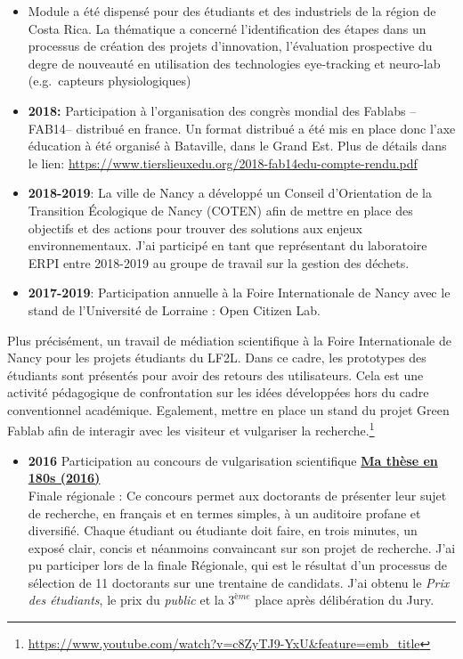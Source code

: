 \documentclass[
  12pt,
  oneside]{book}
\providecommand{\tightlist}{%
  \setlength{\itemsep}{0pt}\setlength{\parskip}{0pt}}
\begin{document}
\begin{itemize}
\item
  Module a été dispensé pour des étudiants et des industriels de la région de Costa Rica.
  La thématique a concerné l'identification des étapes dans un processus de création des projets d'innovation, l'évaluation prospective du degre de nouveauté en utilisation des technologies eye-tracking et neuro-lab (e.g.~capteurs physiologiques)
\item
  \textbf{2018:} Participation à l'organisation des congrès mondial des Fablabs --FAB14-- distribué en france. Un format distribué a été mis en place donc l'axe éducation à été organisé à Bataville, dans le Grand Est.
  Plus de détails dans le lien: \url{https://www.tierslieuxedu.org/2018-fab14edu-compte-rendu.pdf}
\item
  \textbf{2018-2019}: La ville de Nancy a développé un Conseil d'Orientation de la Transition Écologique de Nancy (COTEN) afin de mettre en place des objectifs et des actions pour trouver des solutions aux enjeux environnementaux.
  J'ai participé en tant que représentant du laboratoire ERPI entre 2018-2019 au groupe de travail sur la gestion des déchets.
\item
  \textbf{2017-2019}: Participation annuelle à la Foire Internationale de Nancy avec le stand de l'Université de Lorraine : Open Citizen Lab.
\end{itemize}

Plus précisément, un travail de médiation scientifique à la Foire Internationale de Nancy pour les projets étudiants du LF2L. Dans ce cadre, les prototypes des étudiants sont présentés pour avoir des retours des utilisateurs. Cela est une activité pédagogique de confrontation sur les idées développées hors du cadre conventionnel académique.
Egalement, mettre en place un stand du projet Green Fablab afin de interagir avec les visiteur et vulgariser la recherche.\footnote{\url{https://www.youtube.com/watch?v=c8ZyTJ9-YxU&feature=emb_title}}

\begin{itemize}
\tightlist
\item
  \textbf{2016} Participation au concours de vulgarisation scientifique \href{http://videos.univ-lorraine.fr/index.php?act=view&id=3475}{\textbf{Ma thèse en 180s (2016)}}\\
  Finale régionale : Ce concours permet aux doctorants de présenter leur sujet de recherche, en français et en termes simples, à un auditoire profane et diversifié. Chaque étudiant ou étudiante doit faire, en trois minutes, un exposé clair, concis et néanmoins convaincant sur son projet de recherche.
  J'ai pu participer lors de la finale Régionale, qui est le résultat d'un processus de sélection de 11 doctorants sur une trentaine de candidats.
  J'ai obtenu le \textit{Prix des étudiants}, le prix du \textit{public} et la \(3^{ème}\) place après délibération du Jury.
\end{itemize}
\end{document}
